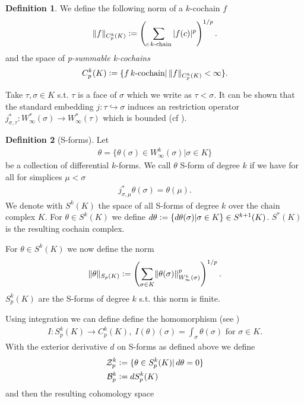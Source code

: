 \documentclass[12pt,a4paper]{article}
\theoremstyle{definition}
\newtheorem{definition}{Definition}
\newcommand{\norm}[1]{\lVert #1 \rVert}
\begin{document}
\begin{definition}
    We define the following norm of a $k$-cochain $f$
    \begin{align*}
    \norm{f}_{C_p^k(K)} \vcentcolon= 
    \left( \sum\limits_{c \, k\text{-chain}} |f(c)|^p \right)^{1/p}.
    \end{align*}
    and the space of \textit{p-summable k-cochains}
    \begin{align*}
    C_p^k(K) \vcentcolon= \{f \, k\text{-cochain} | \,  
    \norm{f}_{C_p^k(K)} < \infty \}.
    \end{align*}
\end{definition}
Take $\tau, \sigma \in K$ s.t. $\tau$ is a face of $\sigma$ which we write as
$\tau < \sigma$. It can be shown that the standard embedding 
$j: \tau \hookrightarrow \sigma$ induces an
restriction operator 
$j^*_{\sigma, \tau}:W^*_\infty(\sigma) \rightarrow W^*_\infty(\tau) $ which is 
bounded (cf \cite[p.191]{goldshtein}). 
\begin{definition}[S-forms]
    Let 
    \begin{align*}
    \theta = \{ \theta(\sigma) \in W^k_\infty(\sigma) | \sigma \in K\}
    \end{align*}
    be a collection of differential $k$-forms. We call $\theta$ S-form of degree
    $k$ if we have for all for simplices
    $\mu <\sigma$ 
    \begin{align*}
    j^*_{\sigma,\mu}\theta(\sigma) = \theta(\mu).
    \end{align*}
    We denote with $S^k(K)$ the space of all S-forms of degree $k$ over the chain
    complex $K$. 
    For $\theta \in S^k(K)$ we define $d\theta \vcentcolon= \{ d\theta(\sigma) | 
    \sigma \in K \} \in S^{k+1}(K)$. $S^*(K)$ is the resulting cochain complex.
\end{definition}
For $\theta \in S^k(K)$ we now define the norm
\begin{align*}
\lVert \theta \rVert _{S_p(K)}  \vcentcolon= \left( \sum_{\sigma \in K} 
\lVert \theta(\sigma) \rVert _{W^k_\infty(\sigma)}^p \right)^{1/p}.
\end{align*} 
$S^k_p(K)$ are the S-forms of degree $k$ s.t. this norm is finite.

Using integration we can define define the homomorphism 
(see \cite[p.191]{goldshtein})
\begin{align*}
I: S_p^k(K) \rightarrow C_p^k(K), \; I(\theta)(\sigma) = 
\int_\sigma \theta(\sigma) \text{ for } \sigma \in K.
\end{align*}
With the exterior derivative $d$ on S-forms as defined above we define 
\begin{align*}
    \mathcal{Z}_p^k &\vcentcolon= \{ \theta \in S^k_p(K) | \, d\theta = 0 \} \\
    \mathcal{B}_p^k &\vcentcolon= dS^k_p(K)
\end{align*}
and then the resulting cohomology space
\end{document}
